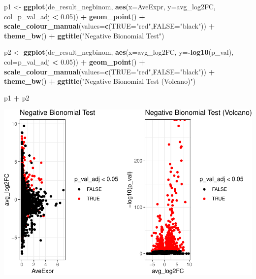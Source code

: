 \documentclass[
]{book}
\newenvironment{Shaded}{\begin{snugshade}}{\end{snugshade}}
\newcommand{\AttributeTok}[1]{\textcolor[rgb]{0.13,0.29,0.53}{#1}}
\newcommand{\FloatTok}[1]{\textcolor[rgb]{0.00,0.00,0.81}{#1}}
\newcommand{\FunctionTok}[1]{\textcolor[rgb]{0.13,0.29,0.53}{\textbf{#1}}}
\newcommand{\NormalTok}[1]{#1}
\newcommand{\OtherTok}[1]{\textcolor[rgb]{0.56,0.35,0.01}{#1}}
\newcommand{\SpecialCharTok}[1]{\textcolor[rgb]{0.81,0.36,0.00}{\textbf{#1}}}
\newcommand{\StringTok}[1]{\textcolor[rgb]{0.31,0.60,0.02}{#1}}
\begin{document}
\begin{Shaded}
\begin{Highlighting}[]
\NormalTok{p1 }\OtherTok{\textless{}{-}} \FunctionTok{ggplot}\NormalTok{(de\_result\_negbinom, }\FunctionTok{aes}\NormalTok{(}\AttributeTok{x=}\NormalTok{AveExpr, }\AttributeTok{y=}\NormalTok{avg\_log2FC, }\AttributeTok{col=}\NormalTok{p\_val\_adj }\SpecialCharTok{\textless{}} \FloatTok{0.05}\NormalTok{)) }\SpecialCharTok{+}
  \FunctionTok{geom\_point}\NormalTok{() }\SpecialCharTok{+}
  \FunctionTok{scale\_colour\_manual}\NormalTok{(}\AttributeTok{values=}\FunctionTok{c}\NormalTok{(}\StringTok{\textquotesingle{}TRUE\textquotesingle{}}\OtherTok{=}\StringTok{"red"}\NormalTok{,}\StringTok{\textquotesingle{}FALSE\textquotesingle{}}\OtherTok{=}\StringTok{"black"}\NormalTok{)) }\SpecialCharTok{+} 
  \FunctionTok{theme\_bw}\NormalTok{() }\SpecialCharTok{+}
  \FunctionTok{ggtitle}\NormalTok{(}\StringTok{"Negative Bionomial Test"}\NormalTok{)}


\NormalTok{p2 }\OtherTok{\textless{}{-}} \FunctionTok{ggplot}\NormalTok{(de\_result\_negbinom, }\FunctionTok{aes}\NormalTok{(}\AttributeTok{x=}\NormalTok{avg\_log2FC, }\AttributeTok{y=}\SpecialCharTok{{-}}\FunctionTok{log10}\NormalTok{(p\_val), }\AttributeTok{col=}\NormalTok{p\_val\_adj }\SpecialCharTok{\textless{}} \FloatTok{0.05}\NormalTok{)) }\SpecialCharTok{+}
  \FunctionTok{geom\_point}\NormalTok{() }\SpecialCharTok{+}
  \FunctionTok{scale\_colour\_manual}\NormalTok{(}\AttributeTok{values=}\FunctionTok{c}\NormalTok{(}\StringTok{\textquotesingle{}TRUE\textquotesingle{}}\OtherTok{=}\StringTok{"red"}\NormalTok{,}\StringTok{\textquotesingle{}FALSE\textquotesingle{}}\OtherTok{=}\StringTok{"black"}\NormalTok{)) }\SpecialCharTok{+} 
  \FunctionTok{theme\_bw}\NormalTok{() }\SpecialCharTok{+}
  \FunctionTok{ggtitle}\NormalTok{(}\StringTok{"Negative Bionomial Test (Volcano)"}\NormalTok{)}

\NormalTok{p1 }\SpecialCharTok{+}\NormalTok{ p2}
\end{Highlighting}
\end{Shaded}

\includegraphics{scRNAseqInR_ABACBS_2024_Doco_files/figure-latex/unnamed-chunk-54-1.pdf}
\end{document}
